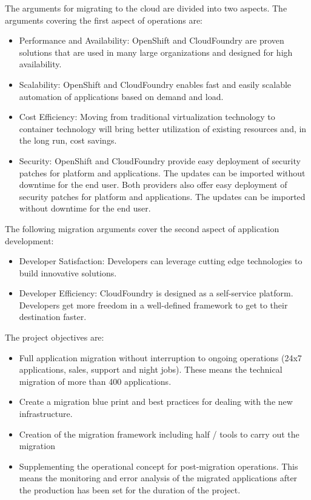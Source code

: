 The arguments for migrating to the cloud are divided into two aspects. The arguments covering the first aspect of operations are:
\begin{itemize}
    \item Performance and Availability: OpenShift and CloudFoundry are proven solutions that are used in many large organizations and designed for high availability.
    \item Scalability: OpenShift and CloudFoundry enables fast and easily scalable automation of applications based on demand and load.
    \item Cost Efficiency: Moving from traditional virtualization technology to container technology will bring better utilization of existing resources and, in the long run, cost savings.
    \item Security: OpenShift and CloudFoundry provide easy deployment of security patches for platform and applications. The updates can be imported without downtime for the end user. Both providers also offer easy deployment of security patches for platform and applications. The updates can be imported without downtime for the end user.
\end{itemize}
The following migration arguments cover the second aspect of application development:
\begin{itemize}
    \item Developer Satisfaction: Developers can leverage cutting edge technologies to build innovative solutions.
    \item Developer Efficiency: CloudFoundry is designed as a self-service platform. Developers get more freedom in a well-defined framework to get to their destination faster.
\end{itemize}

The project objectives are:
\begin{itemize}
    \item Full application migration without interruption to ongoing operations (24x7 applications, sales, support and night jobs). These means the technical migration of more than 400 applications.
    \item Create a migration blue print and best practices for dealing with the new infrastructure.
    \item Creation of the migration framework including half / tools to carry out the migration
    \item Supplementing the operational concept for post-migration operations. This means the monitoring and error analysis of the migrated applications after the production has been set for the duration of the project.
\end{itemize}

